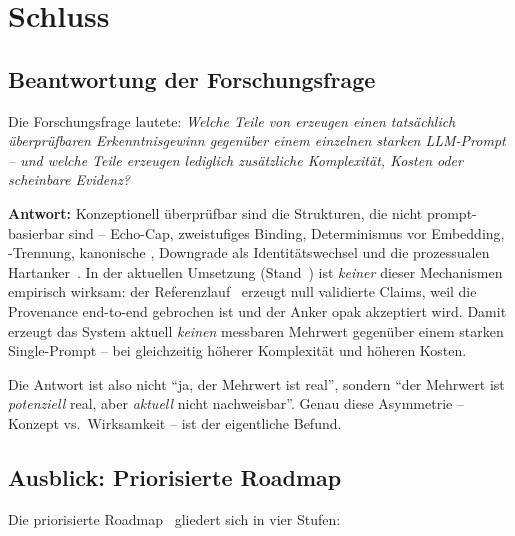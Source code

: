 
\chapter{Schluss}\label{ch:schluss}

\section{Beantwortung der Forschungsfrage}\label{sec:antwort}

Die Forschungsfrage lautete: \emph{Welche Teile von \agora{} erzeugen einen tats{\"a}chlich {\"u}berpr{\"u}fbaren Erkenntnisgewinn gegen{\"u}ber einem einzelnen starken LLM-Prompt -- und welche Teile erzeugen lediglich zus{\"a}tzliche Komplexit{\"a}t, Kosten oder scheinbare Evidenz?}

\textbf{Antwort:} Konzeptionell {\"u}berpr{\"u}fbar sind die Strukturen, die nicht prompt-basierbar sind -- Echo-Cap, zweistufiges Binding, Determinismus vor Embedding, -Trennung, kanonische , Downgrade als Identit{\"a}tswechsel und die prozessualen Hartanker~\cite{adr-0002}. In der aktuellen Umsetzung (Stand~) ist \emph{keiner} dieser Mechanismen empirisch wirksam: der Referenzlauf~\cite{audit-r2} erzeugt null validierte Claims, weil die Provenance end-to-end gebrochen ist und der Anker opak akzeptiert wird. Damit erzeugt das System aktuell \emph{keinen} messbaren Mehrwert gegen{\"u}ber einem starken Single-Prompt -- bei gleichzeitig h{\"o}herer Komplexit{\"a}t und h{\"o}heren Kosten.

Die Antwort ist also nicht \enquote{ja, der Mehrwert ist real}, sondern \enquote{der Mehrwert ist \emph{potenziell} real, aber \emph{aktuell} nicht nachweisbar}. Genau diese Asymmetrie -- Konzept vs.\ Wirksamkeit -- ist der eigentliche Befund.

\section{Ausblick: Priorisierte Roadmap}\label{sec:roadmap}

Die priorisierte Roadmap~\cite{zenodo-agora} gliedert sich in vier Stufen:

